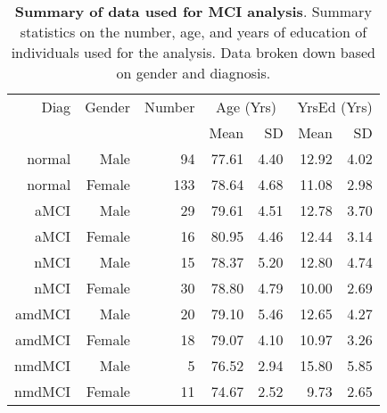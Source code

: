 \documentclass[12pt]{article}\usepackage[]{graphicx}\usepackage[]{color}
\makeatletter
\newenvironment{kframe}{%
 \def\at@end@of@kframe{}%
 \ifinner\ifhmode%
  \def\at@end@of@kframe{\end{minipage}}%
  \begin{minipage}{\columnwidth}%
 \fi\fi%
 \def\FrameCommand##1{\hskip\@totalleftmargin \hskip-\fboxsep
 \colorbox{shadecolor}{##1}\hskip-\fboxsep
     \hskip-\linewidth \hskip-\@totalleftmargin \hskip\columnwidth}%
 \MakeFramed {\advance\hsize-\width
   \@totalleftmargin\z@ \linewidth\hsize
   \@setminipage}}%
 {\par\unskip\endMakeFramed%
 \at@end@of@kframe}
\newcommand\T{\rule{0pt}{2.6ex}}
\newcommand\B{\rule[-1.2ex]{0pt}{0pt}}
\makeatother
\begin{document}




\begin{table}[t]
  \centering
	\begin{tabular}{rrrrrrr}
		\hline
		Diag \T& Gender & Number & \multicolumn{2}{c}{Age (Yrs)} & \multicolumn{2}{c}{YrsEd (Yrs)} \\
		& \B & & Mean & SD & Mean & SD \\ \hline
  \hline
normal & Male &  94 & 77.61 & 4.40 & 12.92 & 4.02 \\ 
  normal & Female & 133 & 78.64 & 4.68 & 11.08 & 2.98 \\ 
  aMCI & Male &  29 & 79.61 & 4.51 & 12.78 & 3.70 \\ 
  aMCI & Female &  16 & 80.95 & 4.46 & 12.44 & 3.14 \\ 
  nMCI & Male &  15 & 78.37 & 5.20 & 12.80 & 4.74 \\ 
  nMCI & Female &  30 & 78.80 & 4.79 & 10.00 & 2.69 \\ 
  amdMCI & Male &  20 & 79.10 & 5.46 & 12.65 & 4.27 \\ 
  amdMCI & Female &  18 & 79.07 & 4.10 & 10.97 & 3.26 \\ 
  nmdMCI & Male &   5 & 76.52 & 2.94 & 15.80 & 5.85 \\ 
  nmdMCI & Female &  11 & 74.67 & 2.52 & 9.73 & 2.65 \\ 
   \hline


	\end{tabular}
	\caption{\textbf{Summary of data used for MCI analysis}.  Summary statistics on the number, age, and years of education of individuals used for the analysis.  Data broken down based on gender and diagnosis.}
	\label{wave1data}
\end{table}

\begin{kframe}


{\ttfamily\noindent\color{warningcolor}{\#\# Warning: package 'ggplot2' was built under R version 3.2.5}}

{\ttfamily\noindent\color{warningcolor}{\#\# Warning: package 'reshape2' was built under R version 3.2.5}}\end{kframe}
\end{document}
